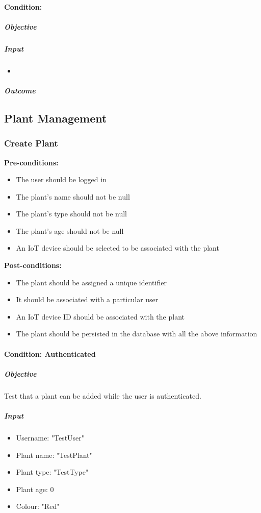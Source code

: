 \documentclass{article}
\begin{document}
		\paragraph{Condition: }
		\subparagraph{Objective}
		
		\subparagraph{Input}
		\begin{itemize}
			\item 
		\end{itemize}
		
		\subparagraph{Outcome}
		
	
	\subsection{Plant Management}
		\subsubsection{Create Plant}
		
		\textbf{Pre-conditions:}
		\begin{itemize}
			\item The user should be logged in
			\item The plant's name should not be null
			\item The plant's type should not be null
			\item The plant's age should not be null
			\item An IoT device should be selected to be associated with the plant
		\end{itemize}
		\textbf{Post-conditions:}
		\begin{itemize}
			\item The plant should be assigned a unique identifier
			\item It should be associated with a particular user
			\item An IoT device ID should be associated with the plant
			\item The plant should be persisted in the database with all the above information
		\end{itemize}
			
		\paragraph{Condition: Authenticated}
		\subparagraph{Objective}
		Test that a plant can be added while the user is authenticated.
		
		\subparagraph{Input}
		\begin{itemize}
			\item Username: "TestUser"
			\item Plant name: "TestPlant"
			\item Plant type: "TestType"
			\item Plant age: 0
			\item Colour: "Red"
		\end{itemize}
		
\end{document}
